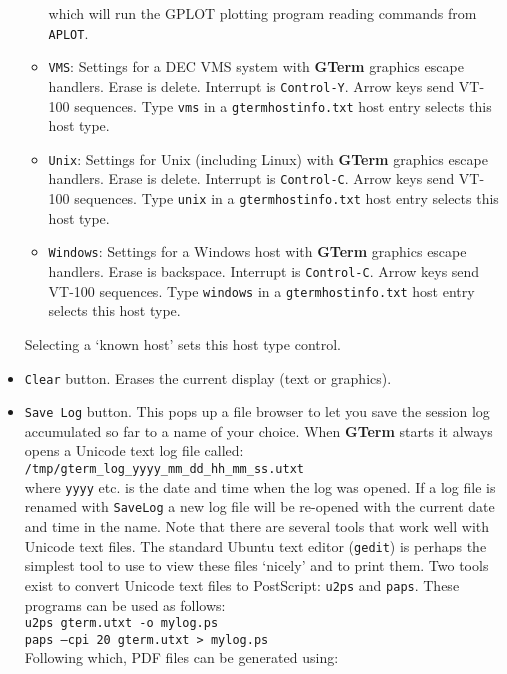\documentclass[a4paper,twoside,11pt]{article}
\begin{document}
\begin{itemize}
\begin{itemize}
            which will run the GPLOT plotting
            program reading commands from \texttt{APLOT}. 
      \item \texttt{VMS}: Settings for a DEC VMS system with \textbf{GTerm} graphics escape handlers. Erase is delete.
            Interrupt is \texttt{Control-Y}. Arrow keys send VT-100 sequences.
            Type \texttt{vms} in a \texttt{gtermhostinfo.txt} host entry selects 
            this host type.
      \item \texttt{Unix}: Settings for Unix (including Linux) with \textbf{GTerm} graphics escape handlers. Erase is
            delete. Interrupt is \texttt{Control-C}. Arrow keys send VT-100 sequences. Type \texttt{unix}
            in a \texttt{gtermhostinfo.txt} host entry selects this host type.
      \item \texttt{Windows}: Settings for a Windows host with \textbf{GTerm} graphics escape handlers. Erase is backspace.
            Interrupt is \texttt{Control-C}. Arrow keys send VT-100 sequences.
            Type \texttt{windows} in a \texttt{gtermhostinfo.txt} host entry selects this host type.
      \end{itemize}
      Selecting a `known host' sets this host type control.
\item \texttt{Clear} button. Erases the current display (text or graphics).
\item \texttt{Save Log} button. This pops up a file browser to let you save the session log accumulated so far
      to a name of your choice. When \textbf{GTerm} starts it always opens a Unicode text log file called:\\
      \texttt{/tmp/gterm\_log\_yyyy\_mm\_dd\_hh\_mm\_ss.utxt}\\
      where \texttt{yyyy} etc. is the date and time when the log was opened. If a log file is renamed with \texttt{SaveLog}
      a new log file will be re-opened with the current date and time in the name. Note that there are several tools
      that work well with Unicode text files. The standard Ubuntu text editor (\texttt{gedit}) is perhaps the simplest tool to use
      to view these files `nicely' and to print them. Two tools exist to convert Unicode text files to PostScript:
      \texttt{u2ps} and \texttt{paps}. These programs can be used as follows:\\
      \texttt{u2ps gterm.utxt -o mylog.ps}\\
      \texttt{paps --cpi 20 gterm.utxt > mylog.ps}\\
      Following which, PDF files can be generated using:\\

\end{itemize}
\end{document}
